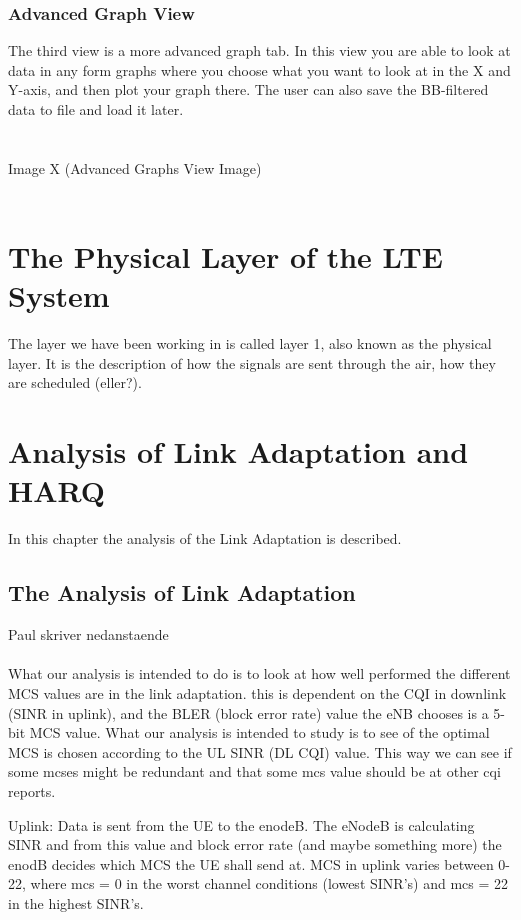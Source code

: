 \documentclass[cropmarks, frame, english]{idamasterthesis}
\begin{document}
\subsection{Advanced Graph View}
The third view is a more advanced graph tab. In this view you are able to look at data in any form graphs where you choose what you want to look at in the X and Y-axis, and then plot your graph there. The user can also save the BB-filtered data to file and load it later. 
\\
\\
\\ 
		Image X (Advanced Graphs View Image)
\\
\\




\chapter{The Physical Layer of the LTE System}
The layer we have been working in is called layer 1, also known as the physical layer. It is the description of how the signals are sent through the air, how they are scheduled (eller?).
 
 
 
 
\chapter{Analysis of Link Adaptation and HARQ}
In this chapter the analysis of the Link Adaptation is described. 

\section{The Analysis of Link Adaptation}
Paul skriver nedanstaende \\ \\
What our analysis is intended to do is to look at how well performed the different MCS values are in the link adaptation. this is dependent on the CQI in downlink (SINR in uplink), and the BLER (block error rate) value the eNB chooses is a 5-bit MCS value. What our analysis is intended to study is to see of the optimal MCS is chosen according to the UL SINR (DL CQI) value. This way we can see if some mcses might be redundant and that some mcs value should be at other cqi reports.

Uplink: \newline
Data is sent from the UE to the enodeB. The eNodeB is calculating SINR and from this value and block error rate (and maybe something more) the enodB decides which MCS the UE shall send at. MCS in uplink varies between 0-22, where mcs = 0 in the worst channel conditions (lowest SINR's) and mcs = 22 in the highest SINR's. 
\end{document}

